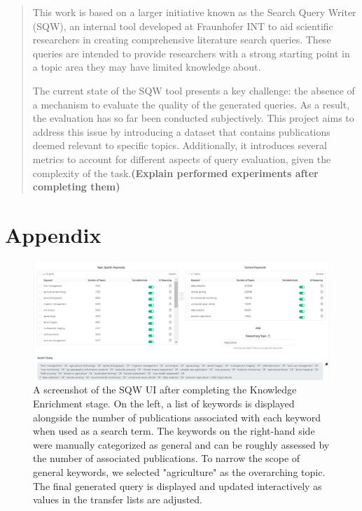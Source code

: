 \documentclass[%
  a4paper,fontsize=11pt,abstract=on,%
  oneside,BCOR=19mm,%
]{scrreprt}
\begin{document}


\begin{abstract}
This work is based on a larger initiative known as the Search Query Writer (SQW), an internal tool developed at Fraunhofer INT to aid scientific researchers in creating comprehensive literature search queries. These queries are intended to provide researchers with a strong starting point in a topic area they may have limited knowledge about. 

The current state of the SQW tool presents a key challenge: the absence of a mechanism to evaluate the quality of the generated queries. As a result, the evaluation has so far been conducted subjectively. This project aims to address this issue by introducing a dataset that contains publications deemed relevant to specific topics. Additionally, it introduces several metrics to account for different aspects of query evaluation, given the complexity of the task.\textbf{(Explain performed experiments after completing them)}

\end{abstract}

\cleardoublepage
\tableofcontents
 \listoffigures

\cleardoublepage
\setcounter{page}{1}










\appendix

\chapter{Appendix}

\begin{figure}
	\centering
	\includegraphics[scale=0.35]{pics/sqw-stage1.png}
	\caption[SQW Knowledge Enrichment]{A screenshot of the SQW UI after completing the Knowledge Enrichment stage. On the left, a list of keywords is displayed alongside the number of publications associated with each keyword when used as a search term. The keywords on the right-hand side were manually categorized as general and can be roughly assessed by the number of associated publications. To narrow the scope of general keywords, we selected "agriculture" as the overarching topic. The final generated query is displayed and updated interactively as values in the transfer lists are adjusted.}

	\label{fig:sqw-stage1}
\end{figure}
\end{document}
